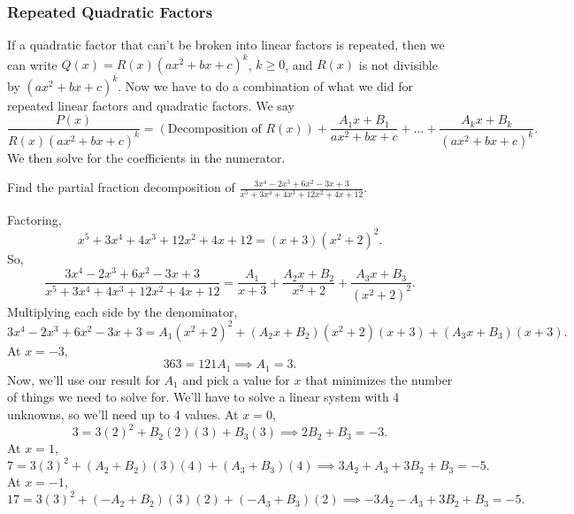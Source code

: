 \subsubsection{Repeated Quadratic Factors}
\noindent
If a quadratic factor that can't be broken into linear factors is repeated, then we can write
$Q(x) = R(x)(ax^2+bx+c)^k$, $k \geq 0$, and $R(x)$ is not divisible by $(ax^2+bx+c)^k$.
Now we have to do a combination of what we did for repeated linear factors and quadratic factors.
We say
\begin{equation*}
	\frac{P(x)}{R(x)(ax^2+bx+c)^k}=\left(\text{Decomposition of }R(x)\right)+\frac{A_1x+B_1}{ax^2+bx+c}+\ldots+\frac{A_kx+B_k}{(ax^2+bx+c)^k}.
\end{equation*}
We then solve for the coefficients in the numerator.

\begin{example}
	Find the partial fraction decomposition of $\frac{3x^4-2x^3+6x^2-3x+3}{x^5+3x^4+4x^3+12x^2+4x+12}$.
\end{example}
\noindent
Factoring,
\begin{equation*}
	x^5+3x^4+4x^3+12x^2+4x+12 = (x+3)(x^2+2)^2.
\end{equation*}
So,
\begin{equation*}
	\frac{3x^4-2x^3+6x^2-3x+3}{x^5+3x^4+4x^3+12x^2+4x+12} = \frac{A_1}{x+3}+\frac{A_2x+B_2}{x^2+2}+\frac{A_3x+B_3}{(x^2+2)^2}.
\end{equation*}
Multiplying each side by the denominator,
\begin{equation*}
	3x^4-2x^3+6x^2-3x+3 = A_1(x^2+2)^2+(A_2x+B_2)(x^2+2)(x+3)+(A_3x+B_3)(x+3).
\end{equation*}
At $x=-3$,
\begin{equation*}
	363 = 121A_1 \implies A_1 = 3.
\end{equation*}
Now, we'll use our result for $A_1$ and pick a value for $x$ that minimizes the number of things we need to solve for. We'll have to solve a linear system with 4 unknowns, so we'll need up to 4 values.
At $x=0$,
\begin{equation*}
	3 = 3(2)^2 + B_2(2)(3)+B_3(3) \implies 2B_2 + B_3 = -3.
\end{equation*}
At $x=1$,
\begin{equation*}
	7 = 3(3)^2 + (A_2+B_2)(3)(4) + (A_3+B_3)(4) \implies 3A_2 + A_3 + 3B_2 + B_3 = -5.
\end{equation*}
At $x=-1$,
\begin{equation*}
	17 = 3(3)^2 + (-A_2+B_2)(3)(2) + (-A_3+B_3)(2) \implies -3A_2 - A_3 + 3B_2 + B_3 = -5.
\end{equation*}
